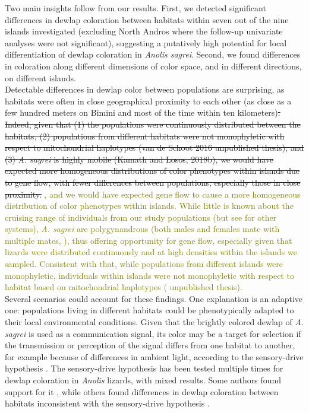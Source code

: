 Two main insights follow from our results. First, we detected significant differences in dewlap coloration between habitats within seven out of the nine islands investigated (excluding North Andros where the follow-up univariate analyses were not significant), suggesting a putatively high potential for local differentiation of dewlap coloration in \textit{Anolis sagrei}. Second, we found differences in coloration along different dimensions of color space, and in different directions, on different islands.\\

Detectable differences in dewlap color between populations are surprising, as habitats were often in close geographical proximity to each other (as close as a few hundred meters on Bimini and most of the time within ten kilometers)\sout{. Indeed, given that (1) the populations were continuously distributed between the habitats, (2) populations from different habitats were not monophyletic with respect to mitochondrial haplotypes (van de Schoot 2016 unpublished thesis), and (3) \textit{A. sagrei} is highly mobile (Kamath and Losos, 2018b), we would have expected more homogeneous distributions of color phenotypes within islands due to gene flow, with fewer differences between populations, especially those in close proximity.} \textcolor{olive}{, and we would have expected gene flow to cause a more homogeneous distribution of color phenotypes within islands. While little is known about the cruising range of individuals from our study populations (but see \citealt{Steinberg2017, Kamath2018} for other systems), \textit{A. sagrei} are polygynandrous (both males and females mate with multiple mates, \citealt{Kamath2017, Kamath2018a, Kamath2018}), thus offering opportunity for gene flow, especially given that lizards were distributed continuously and at high densities within the islands we sampled. Consistent with that, while populations from different islands were monophyletic, individuals within islands were not monophyletic with respect to habitat based on mitochondrial haplotypes (\citealt{vandeSchoot2016} unpublished thesis).}\\

Several scenarios could account for these findings. One explanation is an adaptive one: populations living in different habitats could be phenotypically adapted to their local environmental conditions. Given that the brightly colored dewlap of \textit{A. sagrei} is used as a communication signal, its color may be a target for selection if the transmission or perception of the signal differs from one habitat to another, for example because of differences in ambient light, according to the sensory-drive hypothesis \citep{Endler1988, Endler1992, Endler1998}. The sensory-drive hypothesis has been tested multiple times for dewlap coloration in \textit{Anolis} lizards, with mixed results. Some authors found support for it \citep{Leal2002, Leal2004}, while others found differences in dewlap coloration between habitats inconsistent with the sensory-drive hypothesis \citep{Fleishman2009, Ng2012}.\\

